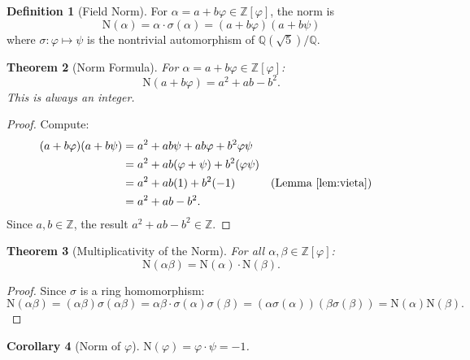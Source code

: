 \documentclass[11pt,a4paper]{article}
\theoremstyle{plain}
\newtheorem{theorem}{Theorem}[section]
\newtheorem{corollary}[theorem]{Corollary}
\theoremstyle{definition}
\newtheorem{definition}[theorem]{Definition}
\newcommand{\Z}{\mathbb{Z}}
\newcommand{\Q}{\mathbb{Q}}
\newcommand{\vp}{\varphi}
\newcommand{\ps}{\psi}
\newcommand{\Norm}{\mathrm{N}}
\begin{document}
\begin{definition}[Field Norm]\label{def:norm}
For $\alpha = a + b\vp \in \Z[\vp]$, the norm is
\begin{equation}\label{eq:norm}
  \Norm(\alpha) = \alpha \cdot \sigma(\alpha)
  = (a + b\vp)(a + b\ps)
\end{equation}
where $\sigma : \vp \mapsto \ps$ is the nontrivial automorphism of
$\Q(\sqrt{5})/\Q$.
\end{definition}

\begin{theorem}[Norm Formula]\label{thm:norm-formula}
For $\alpha = a + b\vp \in \Z[\vp]$:
\begin{equation}\label{eq:norm-explicit}
  \Norm(a + b\vp) = a^{2} + ab - b^{2}.
\end{equation}
This is always an integer.
\end{theorem}

\begin{proof}
Compute:
\begin{align*}
  (a + b\vp)(a + b\ps)
  &= a^{2} + ab\ps + ab\vp + b^{2}\vp\ps\\
  &= a^{2} + ab(\vp + \ps) + b^{2}(\vp\ps)\\
  &= a^{2} + ab(1) + b^{2}(-1) && (\text{Lemma~\ref{lem:vieta}})\\
  &= a^{2} + ab - b^{2}.
\end{align*}
Since $a, b \in \Z$, the result $a^{2} + ab - b^{2} \in \Z$.
\end{proof}

\begin{theorem}[Multiplicativity of the Norm]\label{thm:norm-mult}
For all $\alpha, \beta \in \Z[\vp]$:
\begin{equation}\label{eq:norm-mult}
  \Norm(\alpha\beta) = \Norm(\alpha) \cdot \Norm(\beta).
\end{equation}
\end{theorem}

\begin{proof}
Since $\sigma$ is a ring homomorphism:
\[
  \Norm(\alpha\beta) = (\alpha\beta)\sigma(\alpha\beta)
  = \alpha\beta \cdot \sigma(\alpha)\sigma(\beta)
  = (\alpha\sigma(\alpha))(\beta\sigma(\beta))
  = \Norm(\alpha)\Norm(\beta).
\]
\end{proof}

\begin{corollary}[Norm of $\vp$]\label{cor:norm-phi}
$\Norm(\vp) = \vp \cdot \ps = -1$.
\end{corollary}
\end{document}

